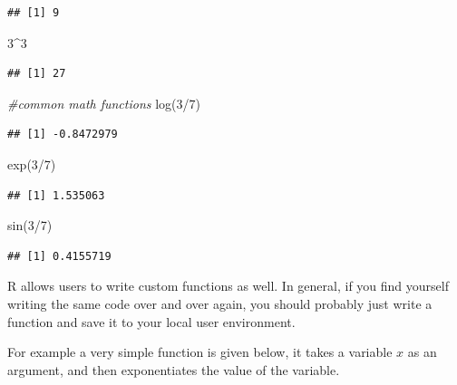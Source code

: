 \documentclass[
]{book}
\newenvironment{Shaded}{\begin{snugshade}}{\end{snugshade}}
\newcommand{\CommentTok}[1]{\textcolor[rgb]{0.56,0.35,0.01}{\textit{#1}}}
\newcommand{\DecValTok}[1]{\textcolor[rgb]{0.00,0.00,0.81}{#1}}
\newcommand{\FunctionTok}[1]{\textcolor[rgb]{0.00,0.00,0.00}{#1}}
\newcommand{\NormalTok}[1]{#1}
\newcommand{\SpecialCharTok}[1]{\textcolor[rgb]{0.00,0.00,0.00}{#1}}
\begin{document}
\begin{verbatim}
## [1] 9
\end{verbatim}

\begin{Shaded}
\begin{Highlighting}[]
\DecValTok{3}\SpecialCharTok{\^{}}\DecValTok{3}
\end{Highlighting}
\end{Shaded}

\begin{verbatim}
## [1] 27
\end{verbatim}

\begin{Shaded}
\begin{Highlighting}[]
\CommentTok{\#common math functions}
\FunctionTok{log}\NormalTok{(}\DecValTok{3}\SpecialCharTok{/}\DecValTok{7}\NormalTok{)}
\end{Highlighting}
\end{Shaded}

\begin{verbatim}
## [1] -0.8472979
\end{verbatim}

\begin{Shaded}
\begin{Highlighting}[]
\FunctionTok{exp}\NormalTok{(}\DecValTok{3}\SpecialCharTok{/}\DecValTok{7}\NormalTok{)}
\end{Highlighting}
\end{Shaded}

\begin{verbatim}
## [1] 1.535063
\end{verbatim}

\begin{Shaded}
\begin{Highlighting}[]
\FunctionTok{sin}\NormalTok{(}\DecValTok{3}\SpecialCharTok{/}\DecValTok{7}\NormalTok{)}
\end{Highlighting}
\end{Shaded}

\begin{verbatim}
## [1] 0.4155719
\end{verbatim}

R allows users to write custom functions as well. In general, if you
find yourself writing the same code over and over again, you should
probably just write a function and save it to your local user
environment.

For example a very simple function is given below, it takes a variable
\(x\) as an argument, and then exponentiates the value of the variable.
\end{document}
